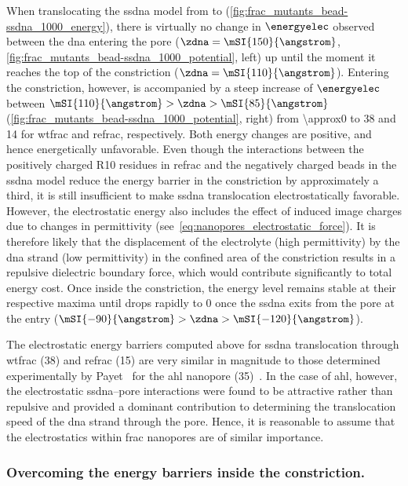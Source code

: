 When translocating the \gls{ssdna} model from \cisi{} to \transi{}
(\cref{fig:frac_mutants_bead-ssdna_1000_energy}), there is virtually no change in $\energyelec$ observed
between the \gls{dna} entering the pore ($\zdna = \mSI{150}{\angstrom}$,
\cref{fig:frac_mutants_bead-ssdna_1000_potential}, left) up until the moment it reaches the top of the
constriction ($\zdna = \mSI{110}{\angstrom}$). Entering the constriction, however, is accompanied by a steep
increase of $\energyelec$ between $ \mSI{110}{\angstrom} > \zdna > \mSI{85}{\angstrom}$
(\cref{fig:frac_mutants_bead-ssdna_1000_potential}, right) from \SI{\approx0}{\kT} to \SI{38}{\kT} and
\SI{14}{\kT} for \gls{wtfrac} and \gls{refrac}, respectively. Both energy changes are positive, and hence
energetically unfavorable. Even though the interactions between the positively charged R10 residues in
\gls{refrac} and the negatively charged beads in the \gls{ssdna} model reduce the energy barrier in the
constriction by approximately a third, it is still insufficient to make \gls{ssdna} translocation
electrostatically favorable. However, the electrostatic energy also includes the effect of induced image
charges due to changes in permittivity (see~\cref{eq:nanopores_electrostatic_force}). It is therefore likely
that the displacement of the electrolyte (high permittivity) by the \gls{dna} strand (low permittivity) in the
confined area of the constriction results in a repulsive dielectric boundary force, which would contribute
significantly to total energy cost. Once inside the constriction, the energy level remains stable at their
respective maxima until drops rapidly to \SI{0}{\kT} once the \gls{ssdna} exits from the pore at the \transi{}
entry ($\mSI{-90}{\angstrom} > \zdna > \mSI{-120}{\angstrom}$).

The electrostatic energy barriers computed above for \gls{ssdna} translocation through \gls{wtfrac}
(\SI{38}{\kT}) and \gls{refrac} (\SI{15}{\kT}) are very similar in magnitude to those determined
experimentally by Payet~\etal{} for the \gls{ahl} nanopore (\SI{35}{\kT})~\cite{Payet-2015}. In the case of
\gls{ahl}, however, the electrostatic \gls{ssdna}--pore interactions were found to be attractive rather than
repulsive and provided a dominant contribution to determining the translocation speed of the \gls{dna} strand
through the pore. Hence, it is reasonable to assume that the electrostatics within \gls{frac} nanopores are of
similar importance.

\subsubsection{Overcoming the energy barriers inside the constriction.}
%

